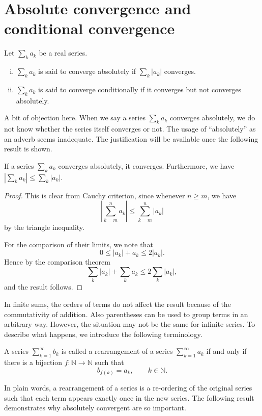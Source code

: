 \documentclass[11pt]{article}
\begin{document}
\section*{Absolute convergence and conditional convergence}

\begin{defn}
  Let $\sum_k a_k$ be a real series.
  \begin{enumerate}[(i)]
    \item $\sum_k a_k$ is said to \textsf{converge absolutely} if $\sum_k |a_k|$ converges.

    \item $\sum_k a_k$ is said to \textsf{converge conditionally} if it converges but not converges absolutely.
  \end{enumerate}
\end{defn}

A bit of objection here.
When we say a series $\sum_k a_k$ converges absolutely, we do not know whether the series itself converges or not.
The usage of ``absolutely'' as an adverb seems inadequate.
The justification will be available once the following result is shown.

\begin{prop}
  If a series $\sum_k a_k$ converges absolutely, it converges.
  Furthermore, we have $| \sum_k a_k | \leqslant \sum_k |a_k|$.
\end{prop}

\begin{proof}
  This is clear from Cauchy criterion, since whenever $n \geqslant m$, we have
  \[
    \left| \sum_{k=m}^n a_k \right| \leqslant \sum_{k=m}^n |a_k|
  \]
  by the triangle inequality.
  
  For the comparison of their limits, we note that
  \[
    0 \leqslant |a_k| + a_k \leqslant 2 |a_k|.
  \]
  Hence by the comparison theorem
  \[
    \sum_k |a_k| + \sum_k a_k \leqslant 2 \sum_k |a_k|,
  \]
  and the result follows.
\end{proof}

In finite sums, the orders of terms do not affect the result because of the commutativity of addition.
Also parentheses can be used to group terms in an arbitrary way.
However, the situation may not be the same for infinite series.
To describe what happens, we introduce the following terminology.

\begin{defn}
  A series $\sum_{k=1}^\infty b_k$ is called a \textsf{rearrangement} of a series $\sum_{k=1}^\infty a_k$ if and only if there is a bijection $f: \mathbb{N} \to \mathbb{N}$ such that
  \[
    b_{f(k)} = a_k, \qquad k \in \mathbb{N}.
  \]
\end{defn}
In plain words, a rearrangement of a series is a re-ordering of the original series such that each term appears exactly once in the new series.
The following result demonstrates why absolutely convergent are so important.
\end{document}
